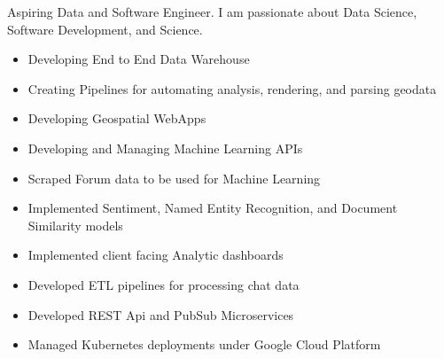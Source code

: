 \documentclass[10pt,a4paper]{altacv}
\begin{document}

\begin{fullwidth}
  \makecvheader

\end{fullwidth}


Aspiring Data and Software Engineer. I am passionate about Data Science, Software Development, and Science.



\begin{itemize}
  \item Developing End to End Data Warehouse
  \item Creating Pipelines for automating analysis, rendering, and parsing geodata
  \item Developing Geospatial WebApps
  \item Developing and Managing Machine Learning APIs
\end{itemize}

\divider

\begin{itemize}
  \item Scraped Forum data to be used for Machine Learning
  \item Implemented Sentiment, Named Entity Recognition, and Document Similarity models
  \item Implemented client facing Analytic dashboards
  \item Developed ETL pipelines for processing chat data
  \item Developed REST Api and PubSub Microservices
  \item Managed Kubernetes deployments under Google Cloud Platform
\end{itemize}
\end{document}
